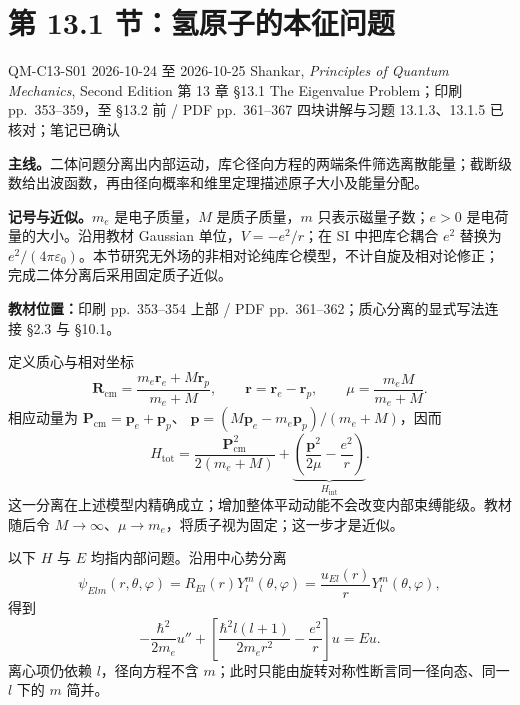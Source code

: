 \section{第 13.1 节：氢原子的本征问题}
\label{section:QM-C13-S01}
\studymeta
  {QM-C13-S01}
  {2026-10-24 至 2026-10-25}
  {Shankar, \textit{Principles of Quantum Mechanics}, Second Edition}
  {第 13 章 \S 13.1 The Eigenvalue Problem；印刷 pp.~353--359，至 \S 13.2 前 / PDF pp.~361--367}
  {四块讲解与习题 13.1.3、13.1.5 已核对；笔记已确认}

\textbf{主线。}二体问题分离出内部运动，库仑径向方程的两端条件筛选离散能量；截断级数给出波函数，再由径向概率和维里定理描述原子大小及能量分配。

\textbf{记号与近似。}$m_e$ 是电子质量，$M$ 是质子质量，$m$ 只表示磁量子数；$e>0$ 是电荷量的大小。沿用教材 Gaussian 单位，$V=-e^2/r$；在 SI 中把库仑耦合 $e^2$ 替换为 $e^2/(4\pi\varepsilon_0)$。本节研究无外场的非相对论纯库仑模型，不计自旋及相对论修正；完成二体分离后采用固定质子近似。

\textbf{教材位置：}印刷 pp.~353--354 上部 / PDF pp.~361--362；质心分离的显式写法连接 \S 2.3 与 \S 10.1。

定义质心与相对坐标
\begin{equation}
  \mathbf R_{\mathrm{cm}}=\frac{m_e\mathbf r_e+M\mathbf r_p}{m_e+M},
  \qquad \mathbf r=\mathbf r_e-\mathbf r_p,\qquad
  \mu=\frac{m_eM}{m_e+M}.
\end{equation}
相应动量为 $\mathbf P_{\mathrm{cm}}=\mathbf p_e+\mathbf p_p$、
$\mathbf p=(M\mathbf p_e-m_e\mathbf p_p)/(m_e+M)$，因而
\begin{equation}
  \boxed{H_{\mathrm{tot}}=
    \frac{\mathbf P_{\mathrm{cm}}^2}{2(m_e+M)}
    +\underbrace{\left(\frac{\mathbf p^2}{2\mu}-\frac{e^2}{r}\right)}_{H_{\mathrm{int}}}.}
\end{equation}
这一分离在上述模型内精确成立；增加整体平动动能不会改变内部束缚能级。教材随后令 $M\to\infty$、$\mu\to m_e$，将质子视为固定；这一步才是近似。


以下 $H$ 与 $E$ 均指内部问题。沿用中心势分离
\begin{equation}
  \psi_{Elm}(r,\theta,\varphi)=R_{El}(r)Y_l^m(\theta,\varphi)
    =\frac{u_{El}(r)}rY_l^m(\theta,\varphi),
\end{equation}
得到
\begin{equation}
  \boxed{-\frac{\hbar^2}{2m_e}u''
    +\left[\frac{\hbar^2l(l+1)}{2m_er^2}-\frac{e^2}{r}\right]u=Eu.}
  \label{eq:QM-C13-S01-radial}
\end{equation}
离心项仍依赖 $l$，径向方程不含 $m$；此时只能由旋转对称性断言同一径向态、同一 $l$ 下的 $m$ 简并。

